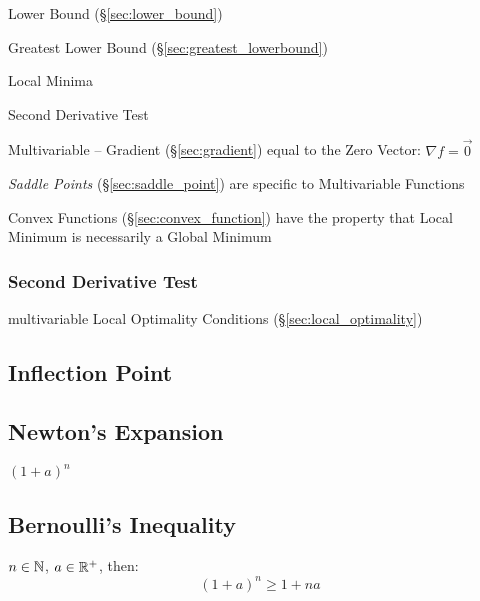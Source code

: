 Lower Bound (\S\ref{sec:lower_bound})

Greatest Lower Bound (\S\ref{sec:greatest_lowerbound})

Local Minima

Second Derivative Test

Multivariable -- Gradient (\S\ref{sec:gradient}) equal to the Zero Vector:
$\nabla{f} = \vec{0}$

\fist \emph{Saddle Points} (\S\ref{sec:saddle_point}) are specific to
Multivariable Functions

Convex Functions (\S\ref{sec:convex_function}) have the property that Local
Minimum is necessarily a Global Minimum



\subsubsection{Second Derivative Test}\label{sec:second_derivative_test}

\fist multivariable Local Optimality Conditions (\S\ref{sec:local_optimality})



\subsection{Inflection Point}\label{sec:inflection_point}

\subsection{Newton's Expansion}\label{sec:newtons_expansion}


$(1 + a)^n$ %



\subsection{Bernoulli's Inequality}\label{sec:bernoullis_inequality}

$n \in \mathbb{N}$, $a \in \mathbb{R}^+$, then:
\[
  (1 + a)^n \geq 1 + n a
\]


